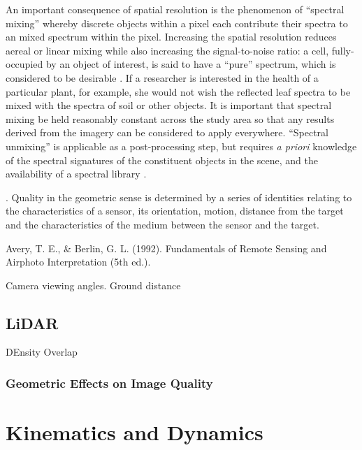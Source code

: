 \documentclass[10pt]{article}
\begin{document}
An important consequence of spatial resolution is the phenomenon of ``spectral mixing'' whereby discrete objects within a pixel each contribute their spectra to an mixed spectrum within the pixel. Increasing the spatial resolution reduces aereal or linear mixing \cite{Gupta2018} while also increasing the signal-to-noise ratio: a cell, fully-occupied by an object of interest, is said to have a ``pure'' spectrum, which is considered to be desirable \cite{Gupta2018}. If a researcher is interested in the health of a particular plant, for example, she would not wish the reflected leaf spectra to be mixed with the spectra of soil or other objects. It is important that spectral mixing be held reasonably constant across the study area so that any results derived from the imagery can be considered to apply everywhere. ``Spectral unmixing'' is applicable as a post-processing step, but requires \emph{a priori} knowledge of the spectral signatures of the constituent objects in the scene, and the availability of a spectral library \cite{Adams1986,Smith1990,Gupta2018}.




 \cite{Gupta2018}. 
Quality in the geometric sense is determined by a series of identities relating to the characteristics of a sensor, its orientation, motion, distance from the target and the characteristics of the medium between the sensor and the target.

\cite{Avery1992}
Avery, T. E., \& Berlin, G. L. (1992). Fundamentals of Remote Sensing and Airphoto Interpretation (5th ed.).

Camera viewing angles.
Ground distance





\subsection{LiDAR}

DEnsity
Overlap


\subsubsection{Geometric Effects on Image Quality}


\section{Kinematics and Dynamics}
\end{document}
